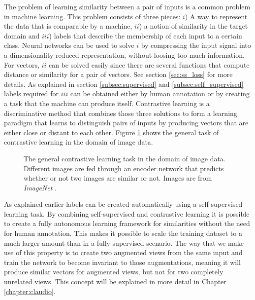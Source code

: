 The problem of learning similarity between a pair of inputs is a common problem in machine learning. This problem consists of three pieces: $i$\label{lst:cli}) A way to represent the data that is comparable by a machine, $ii$\label{lst:clii}) a notion of similarity in the target domain and $iii$\label{lst:cliii}) labels that describe the membership of each input to a certain class. Neural networks can be used to solve \hyperref[lst:cli]{$i$} by compressing the input signal into a dimensionality-reduced representation, without loosing too much information. For vectors, \hyperref[lst:clii]{$ii$} can be solved easily since there are several functions that compute distance or similarity for a pair of vectors. See section \ref{sec:ss_loss} for more details. As explained in section \ref{subsec:supervised} and \ref{subsec:self_supervised} labels required for \hyperref[lst:cliii]{$iii$} can be obtained either by human annotation or by creating a task that the machine can produce itself. Contrastive learning is a discriminative method that combines those three solutions to form a learning paradigm that learns to distinguish pairs of inputs by producing vectors that are either close or distant to each other. Figure \ref{fig:contrastive_learning} shows the general task of contrastive learning in the domain of image data.

\begin{figure}[!h]
    \centering
    
    \caption[Contrastive Learning]{The general contrastive learning task in the domain of image data. Different images are fed through an encoder network that predicts whether or not two images are similar or not. Images are from \textit{ImageNet} \cite{imagenet_cvpr09}.}
    \label{fig:contrastive_learning}
\end{figure}

As explained earlier labels can be created automatically using a self-supervised learning task. By combining self-supervised and contrastive learning it is possible to create a fully autonomous learning framework for similarities without the need for human annotation. This makes it possible to scale the training dataset to a much larger amount than in a fully supervised scenario. The way that we make use of this property is to create two augmented views from the same input and train the network to become invariant to those augmentations, meaning it will produce similar vectors for augmented views, but not for two completely unrelated views. This concept will be explained in more detail in Chapter \ref{chapter:claudio}.

